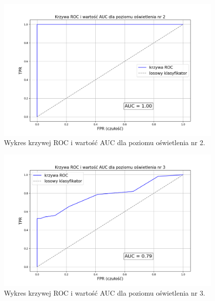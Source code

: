 \begin{figure}[H]
    \centering
    \includegraphics[width=\linewidth]{r_test_dokładności/AUC_charts/2.png}
    \caption{Wykres krzywej ROC i wartość AUC dla poziomu oświetlenia nr 2.}
    \label{fig:ROC-2}
\end{figure}

\begin{figure}[H]
    \centering
    \includegraphics[width=\linewidth]{r_test_dokładności/AUC_charts/3.png}
    \caption{Wykres krzywej ROC i wartość AUC dla poziomu oświetlenia nr 3.}
    \label{fig:ROC-3}
\end{figure}

